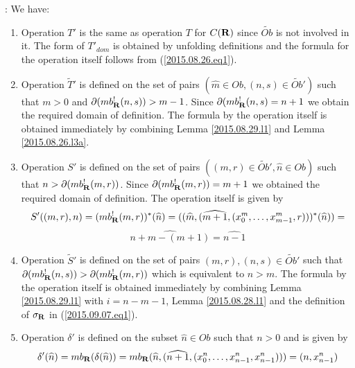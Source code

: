 \documentclass[11pt]{article}
\newenvironment{proof}{{\bf Proof}:}{\vskip 5mm }
\newcommand{\rr}{{\bf R}}
\newcommand{\wt}{\widetilde}
\newcommand{\wh}{\widehat}
\begin{document}
%
\begin{proof}
We have:
%
\begin{enumerate}
%
\item Operation $T'$ is the same as operation $T$ for $C(\rr)$ since $\wt{Ob}$ is not involved in it. The form of $T'_{dom}$ is obtained by unfolding definitions and the formula for the operation itself follows from (\ref{2015.08.26.eq1}).
%
\item Operation $\wt{T}'$ is defined on the set of pairs $(\wh{m}\in Ob, (n,s)\in \wt{Ob}')$ such that $m>0$ and $\partial(mb_{\rr}^!(n,s))>m-1$. Since $\partial(mb_{\rr}^!(n,s)=n+1$ we obtain the required domain of definition. The formula by the operation itself is obtained immediately by combining Lemma \ref{2015.08.29.l1} and Lemma \ref{2015.08.26.l3a}.
%
\item Operation $S'$ is defined on the set of pairs $((m,r)\in \wt{Ob}',\wh{n}\in Ob)$ such that $n>\partial(mb_{\rr}^!(m,r))$. Since $\partial(mb_{\rr}^!(m,r))=m+1$ we obtained the required domain of definition. The operation itself is given by
%
$$S'((m,r),n)=(mb_{\rr}^!(m,r))^*(\wh{n})=((\wh{m},(\wh{m+1},(x_0^m,\dots,x_{m-1}^m,r)))^*(\wh{n}))=$$
$$\wh{n+m-(m+1)}=\wh{n-1}$$
%
\item Operation $\wt{S}'$ is defined on the set of pairs $(m,r),(n,s)\in \wt{Ob}'$ 
such that $\partial(mb_{\rr}^!(n,s))>\partial(mb_{\rr}^!(m,r))$ which is equivalent to $n>m$. The formula by the operation itself is obtained immediately by combining Lemma \ref{2015.08.29.l1} with $i=n-m-1$, Lemma \ref{2015.08.28.l1} and the definition of $\sigma_{\rr}$ in (\ref{2015.09.07.eq1}). 
%
\item Operation $\delta'$ is defined on the subset $\wh{n}\in Ob$ such that $n>0$ and is given by
%
$$\delta'(\wh{n})=mb_{\rr}(\delta(\wh{n}))=mb_{\rr}(\wh{n},(\wh{n+1},(x_0^n,\dots,x_{n-1}^n,x_{n-1}^n)))=(n,x_{n-1}^n)$$
%
\end{enumerate}
\end{proof}
%
\end{document}
